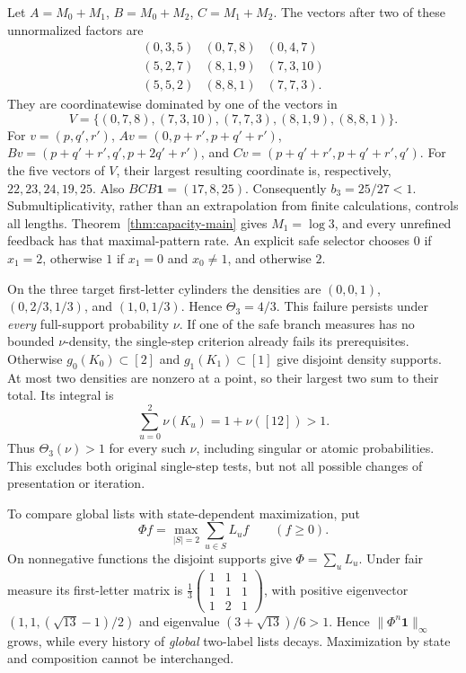 \documentclass[11pt,reqno]{amsart}
\numberwithin{equation}{section}
\theoremstyle{definition}
\theoremstyle{definition}
\newcommand{\one}{\mathbf 1}
\begin{document}
Let $A=M_0+M_1$, $B=M_0+M_2$, $C=M_1+M_2$.
The vectors after two of these unnormalized factors are
\[
\begin{array}{ccc}
(0,3,5)&(0,7,8)&(0,4,7)\\
(5,2,7)&(8,1,9)&(7,3,10)\\
(5,5,2)&(8,8,1)&(7,7,3).
\end{array}
\]
They are coordinatewise dominated by one of the vectors in
\[
 V=\{(0,7,8),(7,3,10),(7,7,3),(8,1,9),(8,8,1)\}.
\]
For $v=(p,q',r')$,
$Av=(0,p+r',p+q'+r')$,
$Bv=(p+q'+r',q',p+2q'+r')$, and
$Cv=(p+q'+r',p+q'+r',q')$.
For the five vectors of $V$, their largest resulting coordinate is,
respectively, $22,23,24,19,25$. Also $BCB\one=(17,8,25)$.
Consequently $b_3=25/27<1$. Submultiplicativity, rather than an
extrapolation from finite calculations, controls all lengths.
Theorem~\ref{thm:capacity-main} gives $M_1=\log3$, and every
unrefined feedback has that maximal-pattern rate. An explicit safe
selector chooses $0$ if $x_1=2$, otherwise $1$ if $x_1=0$ and
$x_0\ne1$, and otherwise $2$.

On the three target first-letter cylinders the densities are
$(0,0,1)$, $(0,2/3,1/3)$, and $(1,0,1/3)$.
Hence $\Theta_3=4/3$. This failure persists under \emph{every}
full-support probability $\nu$. If one of the safe branch measures
has no bounded $\nu$-density, the single-step criterion already
fails its prerequisites. Otherwise $g_0(K_0)\subset[2]$ and
$g_1(K_1)\subset[1]$ give disjoint density supports. At most two
densities are nonzero at a point, so their largest two sum to their
total. Its integral is
\[
 \sum_{u=0}^2\nu(K_u)=1+\nu([12])>1.
\]
Thus $\Theta_3(\nu)>1$ for every such $\nu$, including singular
or atomic probabilities. This excludes both original single-step
tests, but not all possible changes of presentation or iteration.

To compare global lists with state-dependent maximization, put
\[
 \Phi f=\max_{|S|=2}\sum_{u\in S}L_uf\qquad(f\ge0).
\]
On nonnegative functions the disjoint supports give
$\Phi=\sum_uL_u$. Under fair measure its first-letter matrix is
$\frac13\left(\begin{smallmatrix}1&1&1\\1&1&1\\1&2&1\end{smallmatrix}\right)$,
with positive eigenvector
$(1,1,(\sqrt{13}-1)/2)$ and eigenvalue
$(3+\sqrt{13})/6>1$. Hence $\|\Phi^n\one\|_\infty$ grows,
while every history of \emph{global} two-label lists decays.
Maximization by state and composition cannot be interchanged.
\end{document}
